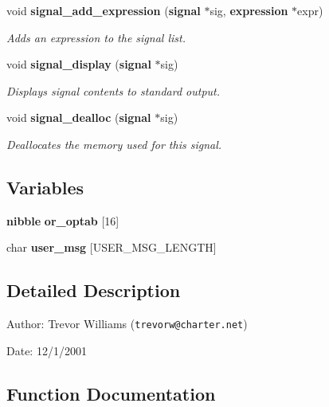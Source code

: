 \begin{CompactItemize}
void {\bf signal\_\-add\_\-expression} ({\bf signal} $\ast$sig, {\bf expression} $\ast$expr)
\begin{CompactList}\small\item\em Adds an expression to the signal list.\item\end{CompactList}\item 
void {\bf signal\_\-display} ({\bf signal} $\ast$sig)
\begin{CompactList}\small\item\em Displays signal contents to standard output.\item\end{CompactList}\item 
void {\bf signal\_\-dealloc} ({\bf signal} $\ast$sig)
\begin{CompactList}\small\item\em Deallocates the memory used for this signal.\item\end{CompactList}\end{CompactItemize}
\subsection*{Variables}
\begin{CompactItemize}
\item 
{\bf nibble} {\bf or\_\-optab} [16]
\item 
char {\bf user\_\-msg} [USER\_\-MSG\_\-LENGTH]
\end{CompactItemize}


\subsection{Detailed Description}
\begin{Desc}
\item[Author:]Trevor Williams ({\tt trevorw@charter.net}) \end{Desc}
\begin{Desc}
\item[Date:]12/1/2001\end{Desc}


\subsection{Function Documentation}
